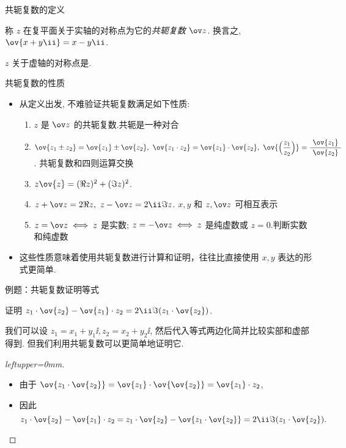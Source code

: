 \begin{frame}{共轭复数的定义}
	\onslide<+->
	\begin{definition}
		称 $z$ 在复平面关于实轴的对称点为它的\emph{共轭复数 $\ov z$}.
		换言之, $\ov{x+y\ii}=x-y\ii$.
	\end{definition}
	\onslide<+->
	\begin{exercise}
		$z$ 关于虚轴的对称点是.
	\end{exercise}
\end{frame}

\begin{frame}{共轭复数的性质}
	\begin{itemize}
		\item 从定义出发, 不难验证共轭复数满足如下性质:
		\begin{enumerate}\bf
			\item $z$ 是 $\ov z$ 的共轭复数.\hfill\alert{共轭是一种对合}
			\item $\ov{z_1\pm z_2}=\ov{z_1}\pm\ov{z_2},\ 
			\ov{z_1\cdot z_2}=\ov{z_1}\cdot\ov{z_2},\ 
			\ov{\Bigl(\dfrac{z_1}{z_2}\Bigr)}=\dfrac{~\ov{z_1}~}{~\ov{z_2}~}$.
			\hfill \alert{共轭复数和四则运算交换}
			\item $z\ov{z}=(\Re z)^2+(\Im z)^2$.
			\item $z+\ov z=2\Re z,\ z-\ov z=2\ii\Im z$.
			\hfill \alert{$x,y$ 和 $z,\ov z$ 可相互表示}
			\item $z=\ov z\iff z$ 是实数; $z=-\ov z\iff z$ 是纯虚数或 $z=0$.\hfill\alert{判断实数和纯虚数}
		\end{enumerate}
		\item 这些性质意味着使用共轭复数进行计算和证明，往往比直接使用 $x,y$ 表达的形式更简单.
	\end{itemize}
\end{frame}


\begin{frame}{例题：共轭复数证明等式}
	\onslide<+->
	\begin{example}
		证明 $z_1\cdot\ov{z_2}-\ov{z_1}\cdot z_2=2\ii\Im(z_1\cdot\ov{z_2})$.
	\end{example}
	\onslide<+->
	我们可以设 $z_1=x_1+y_1\ii,z_2=x_2+y_2\ii$, 然后代入等式两边化简并比较实部和虚部得到.
	\onslide<+->
	但我们利用共轭复数可以更简单地证明它.
	\onslide<+->
	\begin{proof}[leftupper=0mm]
		\begin{itemize}
			\item 由于 $\ov{z_1\cdot\ov{z_2}}=\ov{z_1}\cdot\ov{\ov{z_2}}=\ov{z_1}\cdot z_2$, 
			\item 因此
			\[
				z_1\cdot\ov{z_2}-\ov{z_1}\cdot z_2
				=z_1\cdot\ov{z_2}-\ov{z_1\cdot\ov{z_2}}
				=2\ii\Im(z_1\cdot\ov{z_2}).\qedhere
			\]
		\end{itemize}
	\end{proof}
\end{frame}


